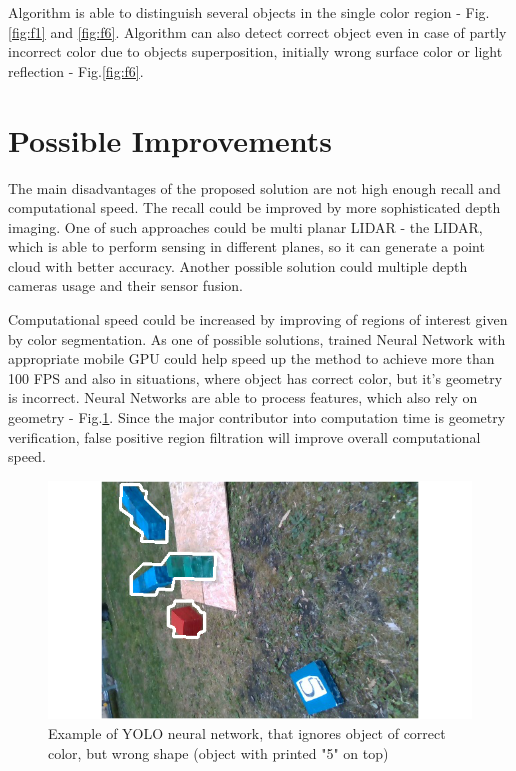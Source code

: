 \documentclass{ctuthesis}
\begin{document}
Algorithm is able to distinguish several objects in the single color region - Fig.\ref{fig:f1} and \ref{fig:f6}. Algorithm can also detect correct object even in case of partly incorrect color due to objects superposition, initially wrong surface color or light reflection - Fig.\ref{fig:f6}. 

\section{Possible Improvements}
The main disadvantages of the proposed solution are not high enough recall and computational speed. The recall could be improved by more sophisticated depth imaging. One of such approaches could be multi planar LIDAR - the LIDAR, which is able to perform sensing in different planes, so it can generate a point cloud with better accuracy. Another possible solution could multiple depth cameras usage and their sensor fusion.

Computational speed could be increased by improving of regions of interest given by color segmentation. As one of possible solutions, trained Neural Network with appropriate mobile GPU could help speed up the method to achieve more than 100 FPS and also in situations, where object has correct color, but it's geometry is incorrect. Neural Networks are able to process features, which also rely on geometry - Fig.\ref{yolo-good}. Since the major contributor into computation time is geometry verification, false positive region filtration will improve overall computational speed.

\begin{figure}[htbp]
    \centering
    \includegraphics[width=\textwidth]{YOLA_corr_obj_cut.png}
    \caption{Example of YOLO neural network, that ignores object of correct color, but wrong shape (object with printed "5" on top)}
    \label{yolo-good}
\end{figure}
\end{document}
